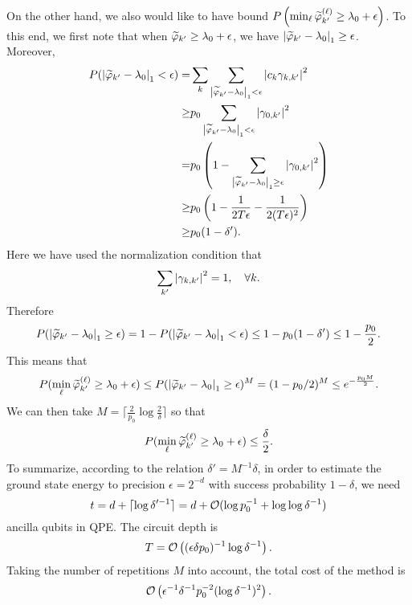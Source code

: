 On the other hand, we also would like to have bound $P\left(\min_{\ell}\widetilde{\varphi}^{(\ell)}_{k'}\ge \lambda_0+\epsilon\right)$.
To this end, we first note that when $\widetilde{\varphi}_{k'}\ge \lambda_0+\epsilon$, we have $\left\lvert\widetilde{\varphi}_{k'}- \lambda_0\right\rvert_1\ge\epsilon$. 
Moreover,
\begin{equation}
\begin{split}
P(\left\lvert\widetilde{\varphi}_{k'}- \lambda_0\right\rvert_1<\epsilon)=&\sum_k \sum_{\left\lvert\widetilde{\varphi}_{k'}- \lambda_0\right\rvert_1<\epsilon} \left\lvert c_k \gamma_{k,k'}\right\rvert^2\\
\ge& p_0 \sum_{\left\lvert\widetilde{\varphi}_{k'}- \lambda_0\right\rvert_1<\epsilon} \left\lvert\gamma_{0,k'}\right\rvert^2\\
=& p_0\left(1- \sum_{\left\lvert\widetilde{\varphi}_{k'}- \lambda_0\right\rvert_1\ge\epsilon} \left\lvert\gamma_{0,k'}\right\rvert^2\right)\\
\ge & p_0\left(1-\frac{1}{2T\epsilon}-\frac{1}{2(T\epsilon)^2}\right)\\
\ge & p_0(1-\delta').
\end{split}
\end{equation} 
Here we have used the normalization condition that
\begin{equation}
\sum_{k'} \left\lvert\gamma_{k,k'}\right\rvert^2=1, \quad \forall k.
\end{equation}
Therefore 
\begin{equation}
P(\left\lvert\widetilde{\varphi}_{k'}- \lambda_0\right\rvert_1\ge\epsilon)=1-P(\left\lvert\widetilde{\varphi}_{k'}- \lambda_0\right\rvert_1<\epsilon)\le 1-p_0(1-\delta')\le 1-\frac{p_0}{2}.
\end{equation} 
This means that
\begin{equation}
P(\min_{\ell}\widetilde{\varphi}^{(\ell)}_{k'}\ge \lambda_0+\epsilon)\le P(\left\lvert\widetilde{\varphi}_{k'}- \lambda_0\right\rvert_1\ge\epsilon)^M=(1-p_0/2)^M\le e^{-\frac{p_0 M}{2}}.
\end{equation}
We can then take $M=\lceil \frac{2}{p_0} \log \frac{2}{\delta} \rceil$ so that
\begin{equation}
P(\min_{\ell}\widetilde{\varphi}^{(\ell)}_{k'}\ge \lambda_0+\epsilon)\le \frac{\delta}{2}.
\end{equation}
To summarize, according to the relation $\delta'=M^{-1} \delta$, in order to estimate the ground state energy to precision $\epsilon=2^{-d}$ with success probability $1-\delta$, we need 
\begin{equation}
t=d+\lceil \log \delta'^{-1}\rceil=d+\mathcal{O}(\log p^{-1}_0+\log\log \delta^{-1})
\end{equation}
ancilla qubits in QPE.
The circuit depth is
\begin{equation}
T=\mathcal{O}\left((\epsilon \delta p_0)^{-1}\log \delta^{-1}\right).
\end{equation}
Taking the number of repetitions $M$ into account, the total cost of the method is
\begin{equation}
  \mathcal{O}\left(\epsilon^{-1} \delta^{-1} p_0^{-2}(\log \delta^{-1})^2\right).
\end{equation}

